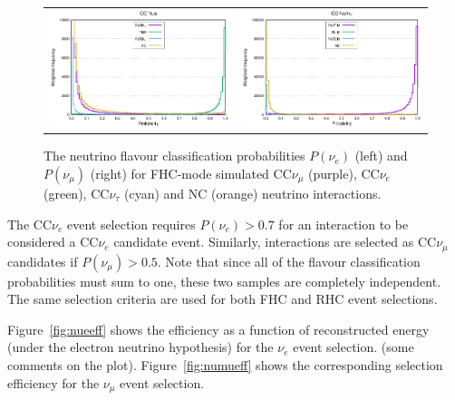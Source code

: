 \begin{figure}
    \centering
    \begin{tabular}{cc}
		\includegraphics[width=0.45\linewidth]{graphics/cvn_nue_prob.eps} &
		\includegraphics[width=0.45\linewidth]{graphics/cvn_numu_prob.eps} 
	\end{tabular}
	\caption{The neutrino flavour classification probabilities $P(\nu_e)$ (left) and $P(\nu_\mu)$ (right) for FHC-mode simulated CC$\nu_\mu$ (purple), CC$\nu_e$ (green), CC$\nu_\tau$ (cyan) and NC (orange) neutrino interactions.}
    \label{fig:cvnprob}
\end{figure}

The CC$\nu_e$ event selection requires $P(\nu_e) > 0.7$ for an interaction to be considered a CC$\nu_e$ candidate event. Similarly, interactions are selected as CC$\nu_\mu$ candidates if $P(\nu_\mu) > 0.5$. Note that since all of the flavour classification probabilities must sum to one, these two samples are completely independent. The same selection criteria are used for both FHC and RHC event selections.

Figure~\ref{fig:nueeff} shows the efficiency as a function of reconstructed energy (under the electron neutrino hypothesis) for the $\nu_e$ event selection. (some comments on the plot). Figure~\ref{fig:numueff} shows the corresponding selection efficiency for the $\nu_\mu$ event selection.

